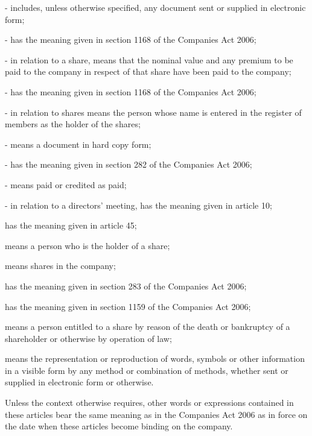 \documentclass[letterpaper,10pt,english]{sphinxmanual}
\begin{document}
 - includes, unless otherwise specified, any document sent or supplied in electronic form;

 - has the meaning given in section 1168 of the Companies Act 2006;

 - in relation to a share, means that the nominal value and any premium to be paid to the company in respect of that share have been paid to the company;

 - has the meaning given in section 1168 of the Companies Act 2006;

 - in relation to shares means the person whose name is entered in the register of members as the holder of the shares;

 - means a document in hard copy form;

 - has the meaning given in section 282 of the Companies Act 2006;

 - means paid or credited as paid;

 - in relation to a directors’ meeting, has the meaning given in article 10;

 has the meaning given in article 45;

 means a person who is the holder of a share;

 means shares in the company;

 has the meaning given in section 283 of the Companies Act 2006;

 has the meaning given in section 1159 of the Companies Act 2006;

 means a person entitled to a share by reason of the death or bankruptcy of a shareholder or otherwise by operation of law;

 means the representation or reproduction of words, symbols or other information in a visible form by any method or combination of methods, whether sent or supplied in electronic form or otherwise.

Unless the context otherwise requires, other words or expressions contained in these articles bear the same meaning as in the Companies Act 2006 as in force on the date when these articles become binding on the company.
\end{document}
